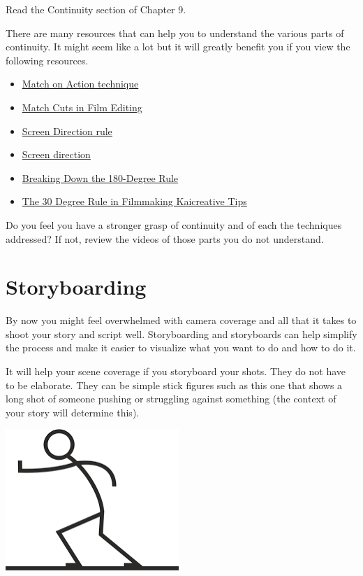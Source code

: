 \documentclass[
]{book}
\providecommand{\tightlist}{%
  \setlength{\itemsep}{0pt}\setlength{\parskip}{0pt}}
\begin{document}
\begin{reflect}
Read the Continuity section of Chapter 9.

There are many resources that can help you to understand the various parts of continuity. It might seem like a lot but it will greatly benefit you if you view the following resources.

\begin{itemize}
\tightlist
\item
  \href{https://www.youtube-nocookie.com/embed/eou7A-e2e4I}{Match on Action technique}
\item
  \href{https://www.youtube-nocookie.com/embed/El28XrjtcMI}{Match Cuts in Film Editing}
\item
  \href{https://www.youtube-nocookie.com/embed/9XOn5uxdSJc}{Screen Direction rule}
\item
  \href{https://www.youtube-nocookie.com/embed/RogoUz_pk4Y}{Screen direction}
\item
  \href{https://www.youtube-nocookie.com/embed/HinUychY3sE}{Breaking Down the 180-Degree Rule}
\item
  \href{https://www.youtube-nocookie.com/embed/1K8EUc98VoQ}{The 30 Degree Rule in Filmmaking \textbar{} Kaicreative \textbar{} Tips}
\end{itemize}

Do you feel you have a stronger grasp of continuity and of each the techniques addressed? If not, review the videos of those parts you do not understand.
\end{reflect}

\hypertarget{storyboarding}{%
\section{Storyboarding}\label{storyboarding}}

By now you might feel overwhelmed with camera coverage and all that it takes to shoot your story and script well. Storyboarding and storyboards can help simplify the process and make it easier to visualize what you want to do and how to do it.

It will help your scene coverage if you storyboard your shots. They do not have to be elaborate. They can be simple stick figures such as this one that shows a long shot of someone pushing or struggling against something (the context of your story will determine this).

\includegraphics{assets/unit5/Picture1.png}
\end{document}
